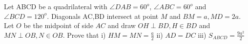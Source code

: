 Let ABCD be a quadrilateral with $\angle DAB=60^o$, $\angle ABC=60^o$ and $\angle BCD=120^o$. Diagonals AC,BD intersect at point $M$ and $BM=a, MD=2a$. Let $O$ be the midpoint of side $AC$ and draw $OH \perp BD, H \in BD$ and $MN\perp OB, N \in OB$. Prove that
i) $HM=MN=\frac{a}{2}$
ii) $AD=DC$
iii) $S_{ABCD}=\frac{9a^2}{2}$